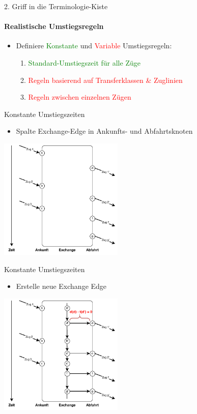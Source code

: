 \begin{frame}{2. Griff in die Terminologie-Kiste}
	\framesubtitle{Realistische Umstiegsregeln}
	\begin{itemize}
		\item Definiere \textcolor{green}{Konstante} und \textcolor{red}{Variable} Umstiegsregeln:
		\begin{enumerate}
			\item \textcolor{green}{Standard-Umstiegszeit für alle Züge}
			\item \textcolor{red}{Regeln basierend auf Transferklassen \& Zuglinien}
			\item \textcolor{red}{Regeln zwischen einzelnen Zügen}
		\end{enumerate}
	\end{itemize}
\end{frame}


\begin{frame}{Konstante Umstiegszeiten}
	\begin{itemize}
		\item Spalte Exchange-Edge in Ankunfts- und Abfahrtsknoten
	\end{itemize}

	\begin{center}
		\includegraphics[height=5.8cm]{images/time_expanded_constant_interchange_0.pdf} 
	\end{center}
\end{frame}


\begin{frame}{Konstante Umstiegszeiten}
	\begin{itemize}
		\item Erstelle neue Exchange Edge
	\end{itemize}

	\begin{center}
		\includegraphics[height=5.8cm]{images/time_expanded_constant_interchange_1.pdf} 
	\end{center}
\end{frame}


